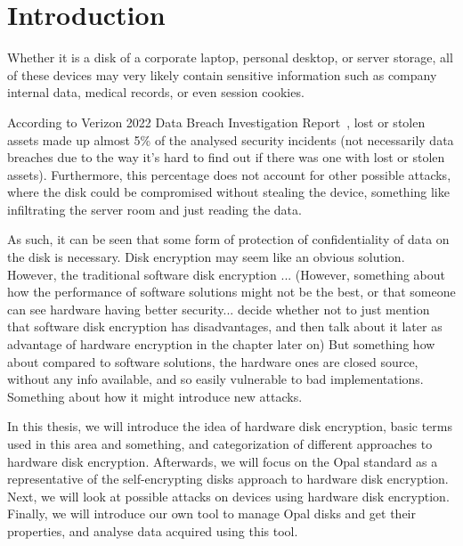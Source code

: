 
\chapter{Introduction}


Whether it is a disk of a corporate laptop, personal desktop, or server storage, all of these devices may very likely contain sensitive information such as company internal data, medical records, or even session cookies.

According to Verizon 2022 Data Breach Investigation Report~\cite{verizon_dbir}, lost or stolen assets made up almost 5\% of the analysed security incidents (not necessarily data breaches due to the way it's hard to find out if there was one with lost or stolen assets). Furthermore, this percentage does not account for other possible attacks, where the disk could be compromised without stealing the device, something like infiltrating the server room and just reading the data.

As such, it can be seen that some form of protection of confidentiality of data on the disk is necessary. Disk encryption may seem like an obvious solution. However, the traditional software disk encryption ... (However, something about how the performance of software solutions might not be the best, or that someone can see hardware having better security... decide whether not to just mention that software disk encryption has disadvantages, and then talk about it later as advantage of hardware encryption in the chapter later on)
But something how about compared to software solutions, the hardware ones are closed source, without any info available, and so easily vulnerable to bad implementations. Something about how it might introduce new attacks.

In this thesis, we will introduce the idea of hardware disk encryption, basic terms used in this area and something, and categorization of different approaches to hardware disk encryption. Afterwards, we will focus on the Opal standard as a representative of the self-encrypting disks approach to hardware disk encryption. Next, we will look at possible attacks on devices using hardware disk encryption. Finally, we will introduce our own tool to manage Opal disks and get their properties, and analyse data acquired using this tool.

\label{TODO}